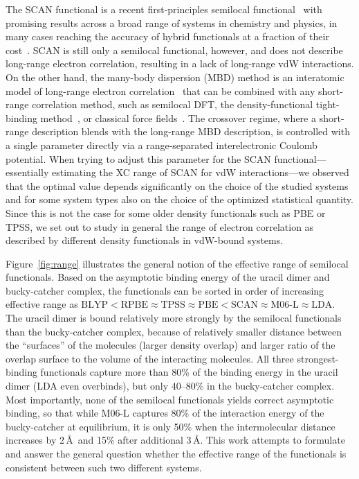 The SCAN functional is a recent first-principles semilocal functional~\cite{SunPRL15} with promising results across a broad range of systems in chemistry and physics, in many cases reaching the accuracy of hybrid functionals at a fraction of their cost~\cite{SunNC16}.
SCAN is still only a semilocal functional, however, and does not describe long-range electron correlation, resulting in a lack of long-range vdW interactions.
On the other hand, the many-body dispersion (MBD) method is an interatomic model of long-range electron correlation~\cite{TkatchenkoPRL12,AmbrosettiJCP14} that can be combined with any short-range correlation method, such as semilocal DFT, the density-functional tight-binding method~\cite{StohrJCP16}, or classical force fields~\cite{BereauJCP14}.
The crossover regime, where a short-range description blends with the long-range MBD description, is controlled with a single parameter directly via a range-separated interelectronic Coulomb potential.
When trying to adjust this parameter for the SCAN functional---essentially estimating the XC range of SCAN for vdW interactions---we observed that the optimal value depends significantly on the choice of the studied systems and for some system types also on the choice of the optimized statistical quantity.
Since this is not the case for some older density functionals such as PBE or TPSS, we set out to study in general the range of electron correlation as described by different density functionals in vdW-bound systems.

Figure~\ref{fig:range} illustrates the general notion of the effective range of semilocal functionals.
Based on the asymptotic binding energy of the uracil dimer and bucky-catcher complex, the functionals can be sorted in order of increasing effective range as $\text{BLYP}<\text{RPBE}\approx\text{TPSS}\approx\text{PBE}<\text{SCAN}\approx\text{M06-L}\approx\text{LDA}$.
The uracil dimer is bound relatively more strongly by the semilocal functionals than the bucky-catcher complex, because of relatively smaller distance between the ``surfaces'' of the molecules (larger density overlap) and larger ratio of the overlap surface to the volume of the interacting molecules.
All three strongest-binding functionals capture more than 80\% of the binding energy in the uracil dimer (LDA even overbinds), but only 40--80\% in the bucky-catcher complex.
Most importantly, none of the semilocal functionals yields correct asymptotic binding, so that while M06-L captures 80\% of the interaction energy of the bucky-catcher at equilibrium, it is only 50\% when the intermolecular distance increases by 2\,\AA\ and 15\% after additional 3\,\AA\@.
This work attempts to formulate and answer the general question whether the effective range of the functionals is consistent between such two different systems.

